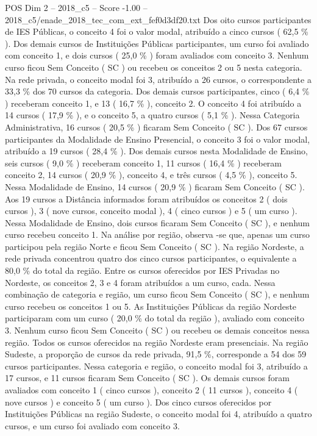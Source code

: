\begin{textsample}{POS Dim 2 – 2018\_c5 – Score -1.00 – 2018\_c5/enade\_2018\_tec\_com\_ext\_fef0d3df20.txt}
Dos oito cursos participantes de IES Públicas, o conceito 4 foi o valor modal, atribuído a cinco cursos ( 62,5 \% ).
Dos demais cursos de Instituições Públicas participantes, um curso foi avaliado com conceito 1, e dois cursos ( 25,0 \% ) foram avaliados com conceito 3.
Nenhum curso ficou Sem Conceito ( SC ) ou recebeu os conceitos 2 ou 5 nesta categoria.
Na rede privada, o conceito modal foi 3, atribuído a 26 cursos, o correspondente a 33,3 \% dos 70 cursos da categoria.
Dos demais cursos participantes, cinco ( 6,4 \% ) receberam conceito 1, e 13 ( 16,7 \% ), conceito 2.
O conceito 4 foi atribuído a 14 cursos ( 17,9 \% ), e o conceito 5, a quatro cursos ( 5,1 \% ).
Nessa Categoria Administrativa, 16 cursos ( 20,5 \% ) ficaram Sem Conceito ( SC ).
Dos 67 cursos participantes da Modalidade de Ensino Presencial, o conceito 3 foi o valor modal, atribuído a 19 cursos ( 28,4 \% ).
Dos demais cursos nesta Modalidade de Ensino, seis cursos ( 9,0 \% ) receberam conceito 1, 11 cursos ( 16,4 \% ) receberam conceito 2, 14 cursos ( 20,9 \% ), conceito 4, e três cursos ( 4,5 \% ), conceito 5.
Nessa Modalidade de Ensino, 14 cursos ( 20,9 \% ) ficaram Sem Conceito ( SC ).
Aos 19 cursos a Distância informados foram atribuídos os conceitos 2 ( dois cursos ), 3 ( nove cursos, conceito modal ), 4 ( cinco cursos ) e 5 ( um curso ).
Nessa Modalidade de Ensino, dois cursos ficaram Sem Conceito ( SC ), e nenhum curso recebeu conceito 1.
Na análise por região, observa -se que, apenas um curso participou pela região Norte e ficou Sem Conceito ( SC ).
Na região Nordeste, a rede privada concentrou quatro dos cinco cursos participantes, o equivalente a 80,0 \% do total da região.
Entre os cursos oferecidos por IES Privadas no Nordeste, os conceitos 2, 3 e 4 foram atribuídos a um curso, cada.
Nessa combinação de categoria e região, um curso ficou Sem Conceito ( SC ), e nenhum curso recebeu os conceitos 1 ou 5.
As Instituições Públicas da região Nordeste participaram com um curso ( 20,0 \% do total da região ), avaliado com conceito 3.
Nenhum curso ficou Sem Conceito ( SC ) ou recebeu os demais conceitos nessa região.
Todos os cursos oferecidos na região Nordeste eram presenciais.
Na região Sudeste, a proporção de cursos da rede privada, 91,5 \%, corresponde a 54 dos 59 cursos participantes.
Nessa categoria e região, o conceito modal foi 3, atribuído a 17 cursos, e 11 cursos ficaram Sem Conceito ( SC ).
Os demais cursos foram avaliados com conceito 1 ( cinco cursos ), conceito 2 ( 11 cursos ), conceito 4 ( nove cursos ) e conceito 5 ( um curso ).
Dos cinco cursos oferecidos por Instituições Públicas na região Sudeste, o conceito modal foi 4, atribuído a quatro cursos, e um curso foi avaliado com conceito 3.

\end{textsample}
